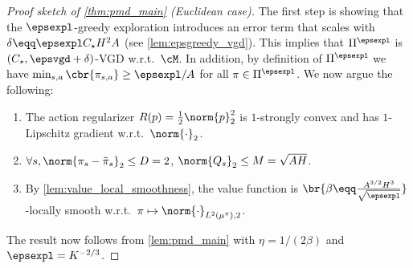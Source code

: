     \begin{proof}[Proof sketch of \cref{thm:pmd_main} (Euclidean case)]
    The first step is showing that the $\epsexpl$-greedy exploration introduces an error term that scales with $\delta \eqq \epsexpl C_\star H^2 A$ (see \cref{lem:epsgreedy_vgd}). This implies that $\Pi^{\epsexpl}$ is $(C_\star, \epsvgd + \delta)$-VGD w.r.t.~$\cM$.
    In addition, by definition of $\Pi^{\epsexpl}$ we have
    $\min_{s, a} \cbr{\pi_{s, a}} \geq \epsexpl/A$
    for all $\pi\in \Pi^\epsexpl$.
    We now argue the following:
    \begin{enumerate}
        \item The action regularizer $R(p)=\frac12\norm{p}_2^2$ is $1$-strongly convex and has $1$-Lipschitz gradient w.r.t.~$\norm{\cdot}_2$.
        \item $\forall s, \norm{\pi_s - \tilde \pi_s}_2\leq D = 2$, $\norm{Q_s}_2\leq M=\sqrt{A H}$.
        \item By \cref{lem:value_local_smoothness}, the value function is 
        $\br{\beta \eqq \frac{A^{3/2} H^3}{\sqrt \epsexpl}}$-locally smooth w.r.t.~$\pi \mapsto \norm{\cdot}_{L^2(\mu^\pi), 2}$.
    \end{enumerate}
    The result now follows from \cref{lem:pmd_main} with $\eta=1/(2\beta)$ and $\epsexpl=K^{-2/3}$.
\end{proof}



